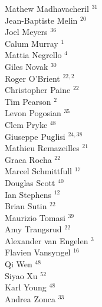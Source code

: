 \documentclass[PICOReport.tex]{subfiles}
\begin{document}
{\begin{multicols}{4}
Mathew Madhavacheril $^{31}$            \\
Jean-Baptiste Melin $^{20}$             \\
Joel Meyers $^{36}$                     \\
Calum Murray $^{1}$                    \\
Mattia Negrello $^{4}$                 \\
Giles Novak $^{30}$                     \\
Roger O'Brient $^{22,2}$                  \\
Christopher Paine $^{22}$               \\
Tim Pearson $^{2}$                     \\
Levon Pogosian $^{35}$                  \\
Clem Pryke $^{48}$                      \\
Giuseppe Puglisi $^{24,38}$                \\
Mathieu Remazeilles $^{21}$             \\
Graca Rocha $^{22}$                     \\
Marcel Schmittfull $^{17}$              \\
Douglas Scott $^{40}$                   \\
Ian Stephens $^{12}$                    \\
Brian Sutin $^{22}$                     \\
Maurizio Tomasi $^{39}$                 \\
Amy Trangsrud $^{22}$                   \\
Alexander van Engelen $^{3}$           \\
Flavien Vansyngel $^{16}$               \\
Qi Wen $^{48}$                          \\
Siyao Xu $^{52}$                        \\
Karl Young $^{48}$                      \\
Andrea Zonca $^{33}$
\end{multicols}
}
\end{document}
